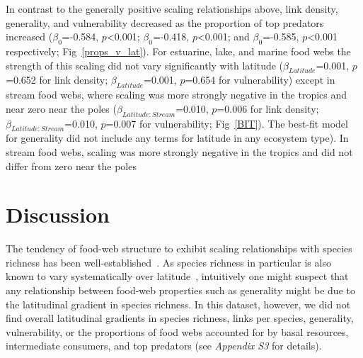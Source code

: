 \documentclass[12pt]{article}
\begin{document}
  In contrast to the generally positive scaling relationships above, link
  density, generality, and vulnerability decreased as the proportion of top
  predators increased ($\beta_0$=-0.584, $p$\textless0.001; $\beta_0$=-0.418,
  $p$\textless0.001; and $\beta_0$=-0.585, $p$\textless0.001 respectively;
  Fig~\ref{props_v_lat}). For estuarine, lake, and marine food webs the
  strength of this scaling did not vary significantly with latitude
  ($\beta_{Latitude}$=0.001, $p$=0.652 for link density;
  $\beta_{Latitude}$=0.001, $p$=0.654 for vulnerability) except in stream food
  webs, where scaling was more strongly negative in the tropics and near zero
  near the poles ($\beta_{Latitude:Stream}$=0.010, $p$=0.006 for link density;
  $\beta_{Latitude:Stream}$=0.010, $p$=0.007 for vulnerability;
  Fig~\ref{BIT}). The best-fit model for generality did not include any terms
  for latitude in any ecosystem type). In stream food webs, scaling was more
  strongly negative in the tropics and did not differ from zero near the poles



\section*{Discussion}

  The tendency of food-web structure to exhibit scaling relationships with
  species richness has been well-established~\citep{Dunne2004,Riede2010}. As
  species richness in particular is also known to vary systematically over
  latitude~\citep{Schemske2009,Macpherson2002,Kaufman1995}, intuitively one
  might suspect that any relationship between food-web properties such as
  generality might be due to the latitudinal gradient in species richness. In
  this dataset, however, we did not find overall latitudinal gradients in
  species richness, links per species,  generality, vulnerability, or the
  proportions of food webs accounted for by  basal resources, intermediate
  consumers, and top predators (see \emph{Appendix S3} for details).
\end{document}
